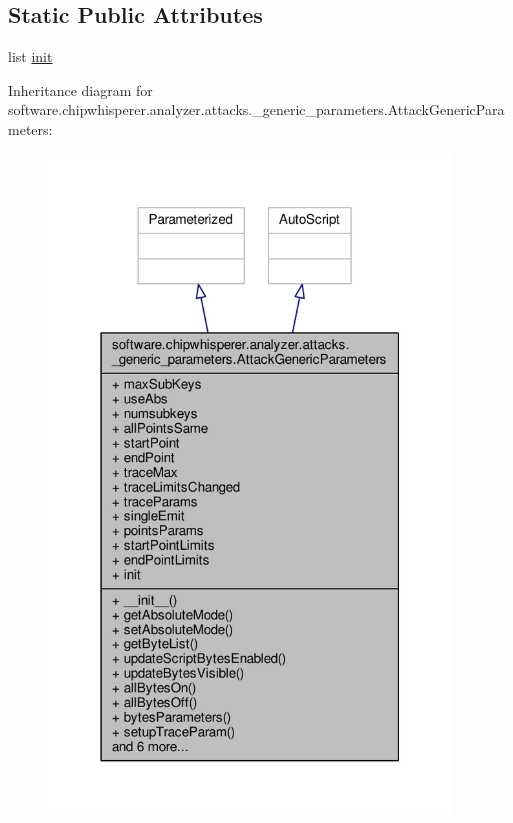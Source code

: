 \subsection*{Static Public Attributes}
\begin{DoxyCompactItemize}
\item 
list \hyperlink{classsoftware_1_1chipwhisperer_1_1analyzer_1_1attacks_1_1__generic__parameters_1_1AttackGenericParameters_a17c07a8794f606bb50b9211c5c649390}{init}
\end{DoxyCompactItemize}


Inheritance diagram for software.\+chipwhisperer.\+analyzer.\+attacks.\+\_\+generic\+\_\+parameters.\+Attack\+Generic\+Parameters\+:\nopagebreak
\begin{figure}[H]
\begin{center}
\leavevmode
\includegraphics[width=303pt]{dd/de7/classsoftware_1_1chipwhisperer_1_1analyzer_1_1attacks_1_1__generic__parameters_1_1AttackGenericParameters__inherit__graph}
\end{center}
\end{figure}


